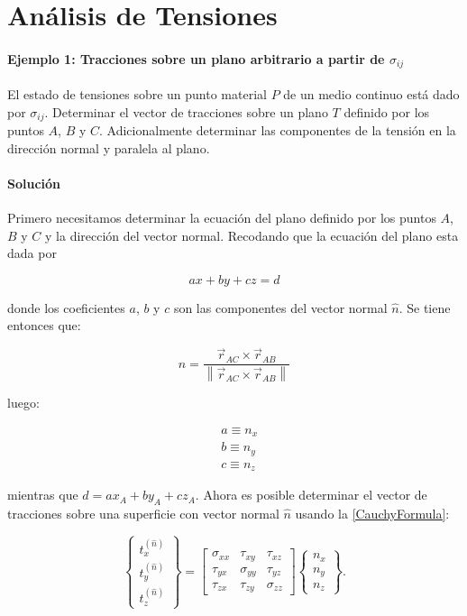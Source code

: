 \documentclass[../notas medios.tex]{subfiles}
\begin{document}
\chapter{Análisis de Tensiones}

\graphicspath{{img/Cap3/}} 								 %



\subsubsection*{Ejemplo 1: Tracciones sobre un plano arbitrario a partir de $\sigma_{ij}$}
El estado de tensiones sobre un punto material $P$ de un medio continuo está
dado por $\sigma_{ij}$. Determinar el vector de tracciones sobre un plano $T$
definido por los puntos $A$, $B$ y $C$. Adicionalmente determinar las
componentes de la tensión en la dirección normal y paralela al plano.
\subsubsection*{Solución}
Primero necesitamos determinar la ecuación del plano definido por los puntos $A$, $B$ y $C$ y la dirección del vector normal. Recodando que la ecuación del plano esta dada por

\[ax+by+cz=d\]

donde los coeficientes $a$, $b$ y $c$ son las componentes del vector normal $\hat{n}$. Se tiene entonces que:

\[\hat n = \frac{{{{\vec r}_{AC}} \times {{\vec r}_{AB}}}}{{\left\| {{{\vec r}_{AC}} \times {{\vec r}_{AB}}} \right\|}}\]

luego:

\begin{align*}
&a \equiv {n_x}\\
&b \equiv {n_y}\\
&c \equiv {n_z}
\end{align*}

mientras que $d=a x_A+b y_A+c z_A$. Ahora es posible determinar el vector de tracciones sobre una superficie con vector normal $\hat{n}$ usando la \cref{CauchyFormula}:


\[
\left\{ {\begin{array}{*{20}{c}}
{t_x^{(\hat n)}}\\
{t_y^{(\hat n)}}\\
{t_z^{(\hat n)}}
\end{array}} \right\} = \left[ {\begin{array}{*{20}{c}}
{{\sigma _{xx}}}&{{\tau _{xy}}}&{{\tau _{xz}}}\\
{{\tau _{yx}}}&{{\sigma _{yy}}}&{{\tau _{yz}}}\\
{{\tau _{zx}}}&{{\tau _{zy}}}&{{\sigma _{zz}}}
\end{array}} \right]\left\{ {\begin{array}{*{20}{c}}
{{n_x}}\\
{{n_y}}\\
{{n_z}}
\end{array}} \right\}.
\]
\end{document}
